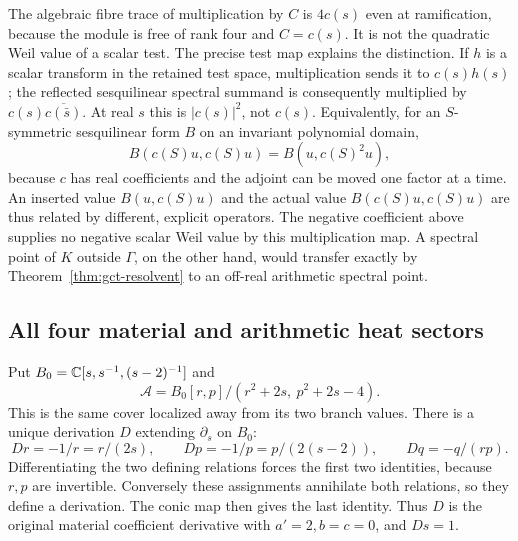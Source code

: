 The algebraic fibre trace of multiplication by $C$ is $4c(s)$ even at
ramification, because the module is free of rank four and $C=c(s)$.
It is not the quadratic Weil value of a scalar test. The precise test
map explains the distinction. If $h$ is a scalar transform in the
retained test space, multiplication sends it to $c(s)h(s)$; the reflected
sesquilinear spectral summand is consequently multiplied by
$c(s)\overline{c(\bar s)}$. At real $s$ this is $|c(s)|^2$, not $c(s)$.
Equivalently, for an $S$-symmetric sesquilinear form $B$ on an invariant
polynomial domain,
\[
 B(c(S)u,c(S)u)=B(u,c(S)^2u),
\]
because $c$ has real coefficients and the adjoint can be moved one
factor at a time. An inserted value $B(u,c(S)u)$ and the actual value
$B(c(S)u,c(S)u)$ are thus related by different, explicit operators.
The negative coefficient above supplies no negative scalar Weil value
by this multiplication map. A spectral point of $K$ outside $\Gamma$,
on the other hand, would transfer exactly by
Theorem~\ref{thm:gct-resolvent} to an off-real arithmetic spectral point.

\subsection{All four material and arithmetic heat sectors}
Put $B_0=\mathbb C[s,s^{-1},(s-2)^{-1}]$ and
\[
 \mathcal A=B_0[r,p]/(r^2+2s,\ p^2+2s-4).
\]
This is the same cover localized away from its two branch values.
There is a unique derivation $D$ extending $\partial_s$ on $B_0$:
\begin{equation}\label{eq:gct-derivation}
 Dr=-1/r=r/(2s),\qquad Dp=-1/p=p/(2(s-2)),
 \qquad Dq=-q/(rp).
\end{equation}
Differentiating the two defining relations forces the first two
identities, because $r,p$ are invertible. Conversely these assignments
annihilate both relations, so they define a derivation. The conic map
then gives the last identity. Thus $D$ is the original material
coefficient derivative with $a'=2,b=c=0$, and $Ds=1$.


